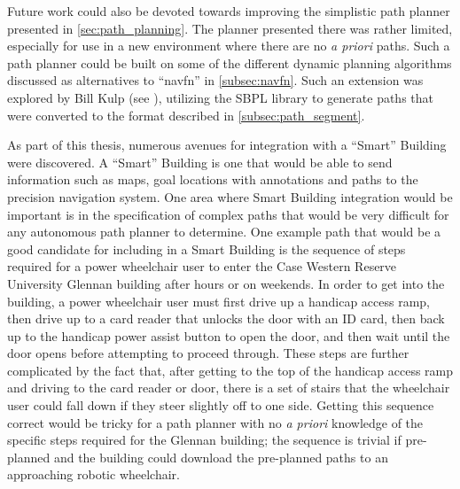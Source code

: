 Future work could also be devoted towards improving the simplistic path planner presented in \autoref{sec:path_planning}. The planner presented there was rather limited, especially for use in a new environment where there are no \emph{a priori} paths. Such a path planner could be built on some of the different dynamic planning algorithms discussed as alternatives to ``navfn'' in \autoref{subsec:navfn}. Such an extension was explored by Bill Kulp (see ), utilizing the SBPL library  to generate paths that were converted to the format described in \autoref{subsec:path_segment}.

As part of this thesis, numerous avenues for integration with a ``Smart'' Building were discovered. A ``Smart'' Building is one that would be able to send information such as maps, goal locations with annotations and paths to the precision navigation system. One area where Smart Building integration would be important is in the specification of complex paths that would be very difficult for any autonomous path planner to determine. One example path that would be a good candidate for including in a Smart Building is the sequence of steps required for a power wheelchair user to enter the Case Western Reserve University Glennan building after hours or on weekends. In order to get into the building, a power wheelchair user must first drive up a handicap access ramp, then drive up to a card reader that unlocks the door with an ID card, then back up to the handicap power assist button to open the door, and then wait until the door opens before attempting to proceed through. These steps are further complicated by the fact that, after getting to the top of the handicap access ramp and driving to the card reader or door, there is a set of stairs that the wheelchair user could fall down if they steer slightly off to one side. Getting this sequence correct would be tricky for a path planner with no \emph{a priori} knowledge of the specific steps required for the Glennan building; the sequence is trivial if pre-planned and the building could download the pre-planned paths to an approaching robotic wheelchair.

\begin{comment}

Details possible areas to expand on this thesis and improve it's performance on our wheelchair platform

Talk about things where a Smart Building can \emph{definitely} help the precision navigation out. Some are obvious such as goal annotation so that things like ``kitchen'' mean something, but others are less obvious.

One of those would be things that would be tricky, even for a good path planner, such as the approach to get into Glennan from the quad-level.

\end{comment}
